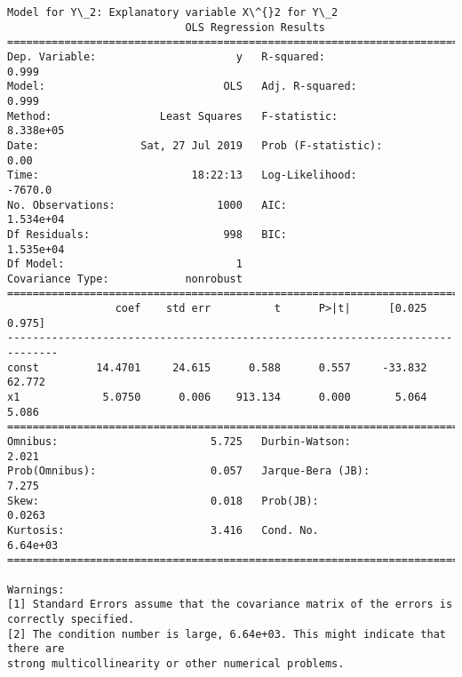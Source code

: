 \documentclass[11pt]{article}
\begin{document}
\begin{Verbatim}[commandchars=\\\{\}]
Model for Y\_2: Explanatory variable X\^{}2 for Y\_2
                            OLS Regression Results                            
==============================================================================
Dep. Variable:                      y   R-squared:                       0.999
Model:                            OLS   Adj. R-squared:                  0.999
Method:                 Least Squares   F-statistic:                 8.338e+05
Date:                Sat, 27 Jul 2019   Prob (F-statistic):               0.00
Time:                        18:22:13   Log-Likelihood:                -7670.0
No. Observations:                1000   AIC:                         1.534e+04
Df Residuals:                     998   BIC:                         1.535e+04
Df Model:                           1                                         
Covariance Type:            nonrobust                                         
==============================================================================
                 coef    std err          t      P>|t|      [0.025      0.975]
------------------------------------------------------------------------------
const         14.4701     24.615      0.588      0.557     -33.832      62.772
x1             5.0750      0.006    913.134      0.000       5.064       5.086
==============================================================================
Omnibus:                        5.725   Durbin-Watson:                   2.021
Prob(Omnibus):                  0.057   Jarque-Bera (JB):                7.275
Skew:                           0.018   Prob(JB):                       0.0263
Kurtosis:                       3.416   Cond. No.                     6.64e+03
==============================================================================

Warnings:
[1] Standard Errors assume that the covariance matrix of the errors is correctly specified.
[2] The condition number is large, 6.64e+03. This might indicate that there are
strong multicollinearity or other numerical problems.



\end{Verbatim}
\end{document}
